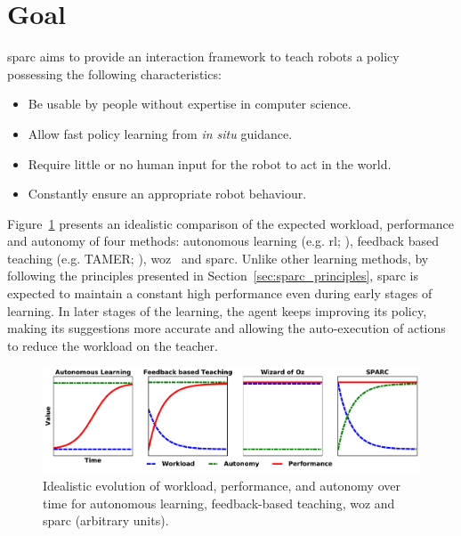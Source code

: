 \section{Goal}

\gls{sparc} aims to provide an interaction framework to teach robots a policy possessing the following characteristics:
\begin{itemize}
	\item Be usable by people without expertise in computer science.
	\item Allow fast policy learning from \textit{in situ} guidance.
	\item Require little or no human input for the robot to act in the world.
	\item Constantly ensure an appropriate robot behaviour.
\end{itemize}

Figure~\ref{fig:concept} presents an idealistic comparison of the expected workload, performance and autonomy of four methods: autonomous learning (e.g. \gls{rl}; \citealt{sutton1998reinforcement}), feedback based teaching (e.g. TAMER; \citealt{knox2009interactively}), \gls{woz}~\citep{riek2012wizard} and \gls{sparc}. Unlike other learning methods, by following the principles presented in Section~\ref{sec:sparc_principles}, \gls{sparc} is expected to maintain a constant high performance even during early stages of learning. In later stages of the learning, the agent keeps improving its policy, making its suggestions more accurate and allowing the auto-execution of actions to reduce the workload on the teacher.

\begin{figure}[ht]
	\includegraphics[width=1\linewidth]{concept.pdf}
	\centering
	\caption{Idealistic evolution of workload, performance, and autonomy over time for autonomous learning, feedback-based teaching, \gls{woz} and \gls{sparc} (arbitrary units).}
	\label{fig:concept}
\end{figure}

